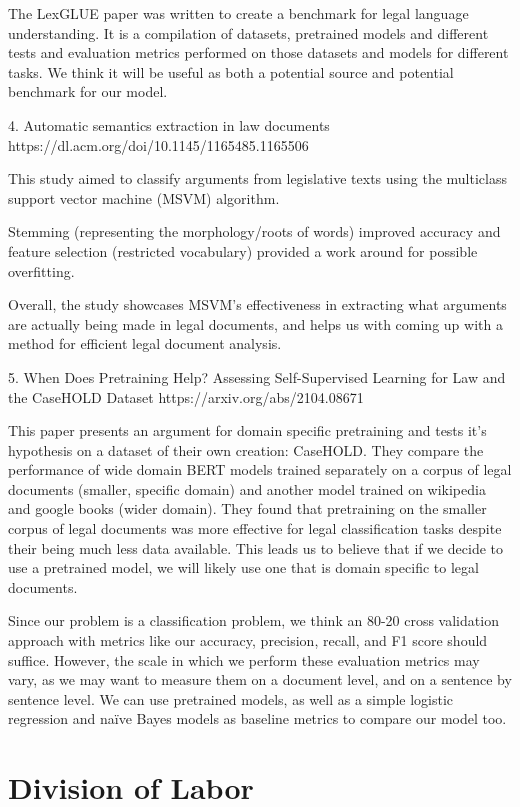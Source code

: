 \documentclass[11pt,a4paper]{article}
\begin{document}
The LexGLUE paper was written to create a benchmark for legal language understanding. It is a compilation of datasets, pretrained models and different tests and evaluation metrics performed on those datasets and models for different tasks. We think it will be useful as both a potential source and potential benchmark for our model.

4. Automatic semantics extraction in law documents
https://dl.acm.org/doi/10.1145/1165485.1165506 

This study aimed to classify arguments from legislative texts using the multiclass support vector machine (MSVM) algorithm.

Stemming (representing the morphology/roots of words) improved accuracy and feature selection (restricted vocabulary) provided a work around for possible overfitting.

Overall, the study showcases MSVM's effectiveness in extracting what arguments are actually being made in legal documents,
and helps us with coming up with a method for efficient legal document analysis.

5. When Does Pretraining Help? Assessing Self-Supervised Learning for Law and the CaseHOLD Dataset
https://arxiv.org/abs/2104.08671

This paper presents an argument for domain specific pretraining and tests it's hypothesis on a dataset of their own creation: CaseHOLD. They compare the performance of wide domain BERT models trained separately on a corpus of legal documents (smaller, specific domain) and another model trained on wikipedia and google books (wider domain). They found that pretraining on the smaller corpus of legal documents was more effective for legal classification tasks despite their being much less data available. This leads us to believe that if we decide to use a pretrained model, we will likely use one that is domain specific to legal documents. 

Since our problem is a classification problem, we think an 80-20 cross validation approach with metrics like our accuracy, precision, recall, and F1 score should suffice. However, the scale in which we perform these evaluation metrics may vary, as we may want to measure them on a document level, and on a sentence by sentence level. We can use pretrained models, as well as a simple logistic regression and naïve Bayes models as baseline metrics to compare our model too. 

\section{Division of Labor}
\end{document}
